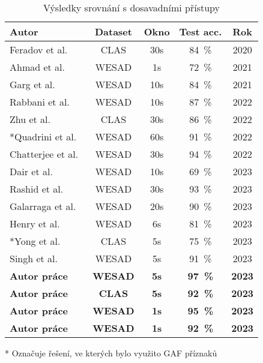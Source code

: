 \begin{table}[h]
    \small
    \centering
    \caption{Výsledky srovnání s dosavadními přístupy}
    \begin{threeparttable}
        \begin{tabular*}{\linewidth}{@{\extracolsep{\fill}} lcccc @{}}
            \toprule
            Autor                                   & Dataset & Okno & Test acc. & Rok  \\ \midrule
            Feradov et al.~\cite{Feradov2020}       & CLAS    & 30s  & 84~\%     & 2020 \\
            Ahmad et al.~\cite{Ahmad2021}           & WESAD   & 1s   & 72~\%     & 2021 \\
            Garg et al.~\cite{Garg2021}             & WESAD   & 10s  & 84~\%     & 2021 \\
            Rabbani et al.~\cite{Rabbani2022}       & WESAD   & 10s  & 87~\%     & 2022 \\
            Zhu et al.~\cite{Zhu2022}               & CLAS    & 30s  & 86~\%     & 2022 \\
            *Quadrini et al.~\cite{Quadrini2022}    & WESAD   & 60s  & 91~\%     & 2022 \\
            Chatterjee et al.~\cite{Chatterjee2022} & WESAD   & 30s  & 94~\%     & 2022 \\
            Dair et al.~\cite{Dair2023}             & WESAD   & 10s  & 69~\%     & 2023 \\
            Rashid et al.~\cite{Rashid2023}         & WESAD   & 30s  & 93~\%     & 2023 \\
            Galarraga et al.~\cite{Galarraga2023}   & WESAD   & 20s  & 90~\%     & 2023 \\
            Henry et al.~\cite{Henry2023}           & WESAD   & 6s   & 81~\%     & 2023 \\
            *Yong et al.~\cite{Yong2023}            & CLAS    & 5s   & 75~\%     & 2023 \\
            Singh et al.~\cite{Singh2023}           & WESAD   & 5s   & 91~\%     & 2023 \\ \midrule
            \textbf{Autor práce}         & \textbf{WESAD}   & \textbf{5s}   & \textbf{97~\%}     & \textbf{2023} \\
            \textbf{Autor práce}         & \textbf{CLAS}    & \textbf{5s}   & \textbf{92~\%}     & \textbf{2023} \\
            \textbf{Autor práce}         & \textbf{WESAD}   & \textbf{1s}   & \textbf{95~\%}     & \textbf{2023} \\
            \textbf{Autor práce}         & \textbf{WESAD}   & \textbf{1s}   & \textbf{92~\%}     & \textbf{2023} \\
            \bottomrule
        \end{tabular*}
        \begin{tablenotes}
            \item [*] Označuje řešení, ve kterých bylo využito \gls{GAF} příznaků
        \end{tablenotes}
    \end{threeparttable}
    \label{tab:state_comparison}
\end{table}

